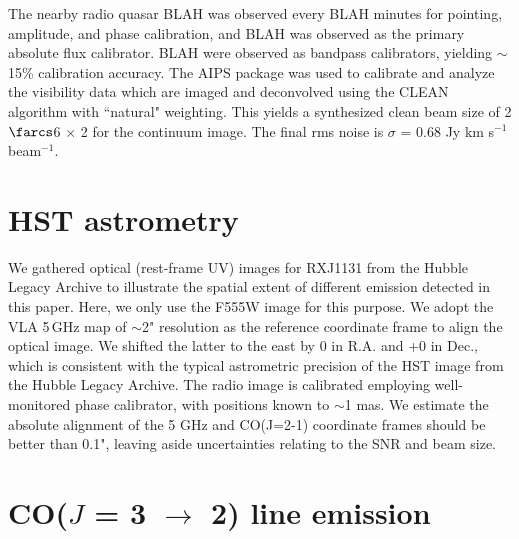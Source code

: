 \documentclass[]{emulateapj}
\begin{document}
The nearby radio quasar BLAH was observed every BLAH minutes for
pointing, amplitude, and phase calibration, and BLAH was observed as the
primary
absolute flux calibrator. BLAH were observed as bandpass calibrators, yielding
$\sim$15\% calibration accuracy.
The AIPS package was used to calibrate and analyze the visibility data which
are imaged and deconvolved using
the CLEAN algorithm with ``natural" weighting. This yields a synthesized clean
beam size of 2$\farcs$6 $\times$ 2 for the continuum image. The final
rms noise is $\sigma$ = 0.68 Jy km s$^{-1}$ beam$^{-1}$.


\section{HST astrometry}
We gathered optical (rest-frame UV) images for RXJ1131 from the Hubble Legacy Archive to illustrate the 
spatial extent of different emission detected in this paper. Here, we only use the F555W image for 
this purpose.
We adopt the VLA 5\,GHz map of $\sim$2" resolution as the reference coordinate frame to align the optical image. 
We shifted the latter to the east by 0 in R.A. and +0 in Dec., which is consistent with the typical astrometric precision of the HST image from the Hubble Legacy Archive. %
The radio image is calibrated employing well-monitored phase calibrator, with positions known to $\sim$1 mas.
We estimate the absolute alignment of the 5 GHz and CO(J=2-1) coordinate frames should
be better than 0.1", leaving aside uncertainties relating to the SNR and beam size.




\section{CO($J$ = 3 $\rightarrow$ 2) line emission}


\end{document}
